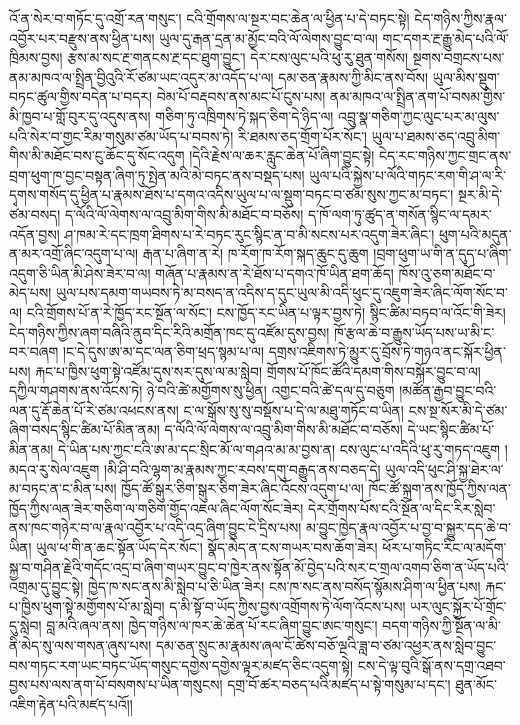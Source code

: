 \documentclass{article}
\begin{document}
འོ་ན་སེར་བ་གཏོང་དུ་འགྲོ་རན་གསུང་། ངའི་གྲོགས་ལ་སྔར་བང་ཆེན་ལ་ཕྱིན་པ་དེ་བཏང་སྟེ། ངེད་གཉིས་ཀྱིས་རྣལ་འབྱོར་པར་བརྫུས་ནས་ཕྱིན་པས། ཡུལ་དུ་རྒན་དྲན་མ་མྱོང་བའི་ལོ་ལེགས་བྱུང་བ་ལ། གང་དགར་རྔ་རྒྱུ་མེད་པའི་ལོ་ཁྲིམས་བྱས། རྩས་མ་སང་རྔ་གནངས་རྔ་དང་ཐུག་བྱུང་། དེར་ངས་ལུང་པའི་ཕུ་རུ་ཐུན་གསོས། སྔགས་བགྲངས་པས་ནམ་མཁའ་ལ་སྤྲིན་བྱིའུའི་རོ་ཙམ་ཡང་འདུར་མ་འདོད་པ་ལ། དམ་ཅན་རྣམས་ཀྱི་མིང་ནས་བོས། ཡུལ་མིས་སྡུག་བཏང་ཚུལ་གྱིས་བདེན་པ་བདར། བེམ་པོ་བརྡབས་ནས་མང་པོ་ངུས་པས། ནམ་མཁའ་ལ་སྤྲིན་ནག་པོ་བསམ་གྱིས་མི་ཁྱབ་པ་གློ་བུར་དུ་འདུས་ནས། གཅིག་ཏུ་འཁྲིགས་ཏེ་སྐད་ཅིག་དེ་ཉིད་ལ། འབྲུ་སྣ་གཅིག་ཀྱང་ལུང་པར་མ་ལུས་པའི་སེར་བ་གྱང་རིམ་གསུམ་ཙམ་ཡོད་པ་བབས་ཏེ། རི་ཐམས་ཅད་གྲོག་པོར་སོང་། ཡུལ་པ་ཐམས་ཅད་འབྲུ་མིག་གིས་མི་མཐོང་བས་ངུ་ཆོང་དུ་སོང་འདུག །དེའི་རྗེས་ལ་ཆར་རླུང་ཆེན་པོ་ཞིག་བྱུང་སྟེ། ངེད་རང་གཉིས་ཀྱང་གྲང་ནས་བྲག་ཕུག་ཁ་བྱང་བསྟན་ཞིག་ཏུ་སྤེན་མའི་མེ་བཏང་ནས་བསྡད་པས། ཡུལ་པའི་སྐྱེས་པ་ལོའི་གཏང་རག་གི་ཤ་ལ་རི་དྭགས་གསོད་དུ་ཕྱིན་པ་རྣམས་ཐོས་པ་དགའ་འདིས་ཡུལ་པ་ལ་སྡུག་བཏང་བ་ཙམ་སུས་ཀྱང་མ་བཏང་། སྔར་མི་དེ་ཙམ་བསད། ད་ལོའི་ལོ་ལེགས་ལ་འབྲུ་མིག་གིས་མི་མཐོང་བ་བཅོས། ད་ཁོ་ལག་ཏུ་ཚུད་ན་གསོན་སྙིང་ལ་དམར་འདོན་བྱས། ཤ་ཁམ་རེ་དང་ཁྲག་ཐིགས་པ་རེ་བཏང་རུང་སྙིང་ན་བ་མི་སངས་པར་འདུག་ཟེར་ཞིང་། ཕུག་པའི་མདུན་ན་མར་འགྲོ་ཞིང་འདུག་པ་ལ། རྒན་པ་ཞིག་ན་རེ། ཁ་རོག་ཁ་རོག་སྐད་ཆུང་དུ་ཆུག །བྲག་ཕུག་ཡ་གི་ན་དུད་པ་ཞིག་འདུག་ཅི་ཡིན་མི་ཤེས་ཟེར་བ་ལ། གཞོན་པ་རྣམས་ན་རེ་ཐོས་པ་དགའ་ཁོ་ཡིན་ཐག་ཆོད། ཁོས་འུ་ཅག་མཐོང་བ་མེད་པས། ཡུལ་པས་དམག་གཡབས་ཏེ་མ་བསད་ན་འདིས་ད་དུང་ཡུལ་མི་འདི་ཕུང་དུ་འཇུག་ཟེར་ཞིང་ལོག་སོང་བ་ལ། ངའི་གྲོགས་པོ་ན་རེ་ཁྱོད་རང་སྔོན་ལ་སོང་། ངས་ཁྱོད་རང་ཡིན་པ་ལྟར་བྱས་ཏེ། སྙིང་ཚིམ་བཏབ་ལ་འོང་གི་ཟེར། ངེད་གཉིས་ཀྱིས་ཞག་བཞིའི་ནུབ་དིང་རིའི་མགྲོན་ཁང་དུ་འཛོམ་དུས་བྱས། ཁོ་རྩལ་ཆེ་བ་རྒྱུས་ཡོད་པས་ཡ་མི་ང་བར་བཞག །ང་དེ་དུས་ཨ་མ་དང་ལན་ཅིག་ཕྲད་སྙམ་པ་ལ། དགྲས་འཇིགས་ཏེ་མྱུར་དུ་བྲོས་ཏེ་གཉའ་ནང་སྐོར་ཕྱིན་པས། རྐང་པ་ཁྱིས་ཕུག་སྟེ་འཛོམ་དུས་སར་དུས་ལ་མ་སླེབ། གྲོགས་པོ་ཁོང་ཚོའི་དམག་གིས་བསྐོར་བྱུང་བ་ལ། དཀྱིལ་གཤགས་ནས་འོངས་ཏེ། ཉེ་བའི་ཚེ་མགྱོགས་སུ་ཕྱིན། འགྱང་བའི་ཚེ་དལ་དུ་བཅུག །མཚོན་རྒྱབ་བྱུང་བའི་ལན་དུ་རྡོ་ཆེན་པོ་རེ་ཙམ་འཕངས་ནས། ང་ལ་སྒོས་སུ་སུ་བསྡོས་པ་དེ་ལ་མཐུ་གཏོང་བ་ཡིན། ངས་སྔ་སོར་མི་དེ་ཙམ་ཞིག་བསད་སྙིང་ཚིམ་པོ་མིན་ནམ། ད་ལོའི་ལོ་ལེགས་ལ་འབྲུ་མིག་གིས་མི་མཐོང་བ་བཅོས། དེ་ཡང་སྙིང་ཚིམ་པོ་མིན་ནམ། དེ་ཡིན་པས་ཀྱང་ངའི་ཨ་མ་དང་སྲིང་མོ་ལ་གཤའ་མ་མ་བྱས་ན། ངས་ལུང་པ་འདིའི་ཕུ་རུ་གཏད་འཇུག །མདའ་རུ་སེལ་འཇུག །མི་ཤི་བའི་ལྷག་མ་རྣམས་ཀྱང་རབས་དགུ་བརྒྱུད་ནས་བཅད་དེ། ཡུལ་འདི་ཕུང་ཤི་སྐྱ་ཐེར་ལ་མ་བཏང་ན་ང་མིན་པས། ཁྱོད་ཚོ་སྒུར་ཅིག་སྒུར་ཅིག་ཟེར་ཞིང་འོངས་འདུག་པ་ལ། ཁོང་ཚོ་སྐྲག་ནས་ཁྱོད་ཀྱིས་ལན་ཁྱོད་ཀྱིས་ལན་ཟེར་གཅིག་ལ་གཅིག་གྱོད་འཇལ་ཞིང་ལོག་སོང་ཟེར། དེར་གྲོགས་པོས་ངའི་སྔོན་ལ་དིང་རིར་སླེབ་ནས་ཁང་གཉེར་བ་ལ་རྣལ་འབྱོར་པ་འདི་འདྲ་ཞིག་བྱུང་ངེ་དྲིས་པས། མ་བྱུང་ཁྱེད་རྣལ་འབྱོར་པ་བྱ་བ་སྐྱུར་དད་ཆེ་བ་ཡིན། ཡུལ་ཕ་གི་ན་ཆང་སྟོན་ཡོད་དེར་སོང་། སྣོད་མེད་ན་ངས་གཡར་བས་ཆོག་ཟེར། ཕོར་པ་གཏིང་རིང་ལ་མདོག་སྐྱ་བ་གཤིན་རྗེའི་གདོང་འདྲ་བ་ཞིག་གཡར་བྱུང་བ་ཁྱེར་ནས་སྟོན་མོ་བྱེད་པའི་སར་ང་གྲལ་འགབ་ཅིག་ན་ཡོད་པའི་འགྲམ་དུ་བྱུང་སྟེ། ཁྱེད་ཁ་སང་ནས་མི་སླེབ་པ་ཅི་ཡིན་ཟེར། ངས་ཁ་སང་ནས་བསོད་སྙོམས་ཤིག་ལ་ཕྱིན་པས། རྐང་པ་ཁྱིས་ཕུག་སྟེ་མགྱོགས་པོ་མ་སླེབ། ད་མི་སྟོ་བ་ཡོད་ཀྱིས་བྱས་འགྲོགས་ཏེ་ལོག་འོངས་པས། ཡར་ལུང་སྐྱོར་པོ་གྲོང་དུ་སླེབ། བླ་མའི་ཞལ་ནས། ཁྱེད་གཉིས་ལ་ཁར་ཆེ་ཆེན་པོ་རང་ཞིག་བྱུང་ཨང་གསུང་། བདག་གཉིས་ཀྱི་སྔོན་ལ་མི་ནི་མེད་སུ་ལས་གསན་ཞུས་པས། དམ་ཅན་སྲུང་མ་རྣམས་ཞལ་ངོ་ཚེས་བཅོ་ལྔའི་ཟླ་བ་ཙམ་འཕྱར་ནས་སླེབ་བྱུང་བས་གཏང་རག་ཡང་བཏང་ཡོད་གསུང་དགྱེས་དགྱེས་ལྟར་མཛད་ཅིང་འདུག་སྟེ། ངས་དེ་ལྟ་བུའི་སྒོ་ནས་དགྲ་འཐབ་བྱས་པས་ལས་ནག་པོ་བསགས་པ་ཡིན་གསུངས། དགྲ་བོ་ཚར་བཅད་པའི་མཛད་པ་སྟེ་གསུམ་པ་དང་། ཐུན་མོང་འཇིག་རྟེན་པའི་མཛད་པའོ།།
\end{document}
